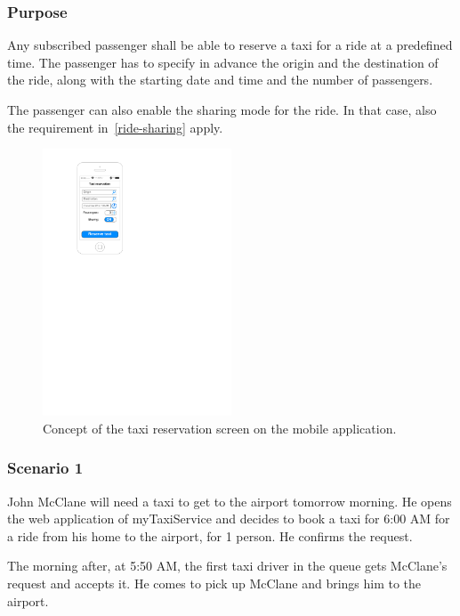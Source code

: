 \label{taxi-reservation}
\subsubsection{Purpose}

Any subscribed passenger shall be able to reserve a taxi for a ride at a predefined time. The passenger has to specify in advance the origin and the destination of the ride, along with the starting date and time and the number of passengers.

The passenger can also enable the sharing mode for the ride.
In that case, also the requirement in~\autoref{ride-sharing} apply.

\begin{figure}
	\begin{center}
	\includegraphics[width=0.5\textwidth]{mockup/TaxiReservation.pdf}
	\caption{Concept of the taxi reservation screen on the mobile application.}
	\label{fig:mockup-reservation}
	\end{center}
\end{figure}

\subsubsection{Scenario 1}
John McClane will need a taxi to get to the airport tomorrow morning. He opens the web application of myTaxiService and decides to book a taxi for 6:00 AM for a ride from his home to the airport, for 1 person. He confirms the request.

The morning after, at 5:50 AM, the first taxi driver in the queue gets McClane's request and accepts it. He comes to pick up McClane and brings him to the airport.

